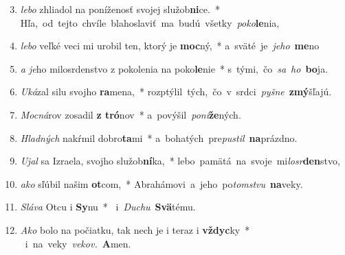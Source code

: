 \begin{flushleft}
\begin{enumerate}[leftmargin=*]
\setcounter{enumi}{2}

\item \textit{lebo} zhliadol na poníženosť svojej služob\textbf{ni}ce.~* \mbox{Hľa, od tejto chvíle blahoslaviť ma budú všetky \textit{poko}\textbf{le}nia,}
\item \textit{lebo} veľké veci mi urobil ten, ktorý je \textbf{moc}ný,~* \mbox{a sväté je \textit{je}\textit{ho} \textbf{me}no}
\item \textit{a je}ho milosrdenstvo z pokolenia na poko\textbf{le}nie~* \mbox{s tými, čo \textit{sa} \textit{ho} \textbf{bo}ja.}
\item \textit{Uká}zal silu svojho \textbf{ra}mena,~* \mbox{rozptýlil tých, čo v srdci \textit{pyšne} \textbf{zmý}šľajú.}
\item \textit{Mocná}rov zosadil \textbf{z tró}nov~* \mbox{a povýšil \textit{poní}\textbf{že}ných.}
\item \textit{Hladných} nakŕmil dobro\textbf{ta}mi~* \mbox{a bohatých pre\textit{pustil} \textbf{na}prázdno.}
\item \textit{Ujal} sa Izraela, svojho služob\textbf{ní}ka,~* \mbox{lebo pamätá na svoje mi\textit{losr}\textbf{den}stvo,}
\item \textit{ako} sľúbil našim \textbf{ot}com,~* \mbox{Abrahámovi a jeho po\textit{tomstvu} \textbf{na}veky.}
\item \textit{Sláva} Otcu i \textbf{Sy}nu~* \mbox{ i \textit{Duchu} \textbf{Svä}tému.}
\item \textit{Ako} bolo na počiatku, tak nech je i teraz i \textbf{vždyc}ky~* \mbox{ i na veky \textit{vekov.} \textbf{A}men.}
\end{enumerate}
\end{flushleft}

